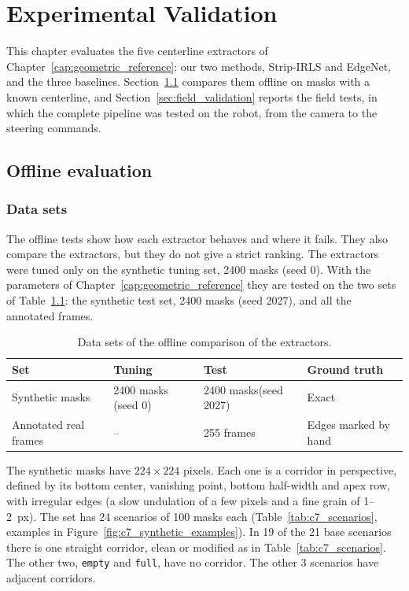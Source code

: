 \chapter{Experimental Validation}
\label{cap:experiments}

This chapter evaluates the five centerline extractors of Chapter~\ref{cap:geometric_reference}: our two methods, Strip-IRLS and EdgeNet, and the three baselines. Section~\ref{sec:offline_evaluation} compares them offline on masks with a known centerline, and Section~\ref{sec:field_validation} reports the field tests, in which the complete pipeline was tested on the robot, from the camera to the steering commands.

\section{Offline evaluation}
\label{sec:offline_evaluation}

\subsection{Data sets}
\label{subsec:geometric_accuracy}

The offline tests show how each extractor behaves and where it fails. They also compare the extractors, but they do not give a strict ranking. The extractors were tuned only on the synthetic tuning set, 2400 masks (seed 0). With the parameters of Chapter~\ref{cap:geometric_reference} they are tested on the two sets of Table~\ref{tab:c7_datasets}: the synthetic test set, 2400 masks (seed 2027), and all the annotated frames.

\begin{table}[htbp]
    \centering
    \footnotesize
    \caption{Data sets of the offline comparison of the extractors.}
    \label{tab:c7_datasets}
    \begin{tabularx}{\textwidth}{@{}l X X l@{}}
        \toprule
        Set & Tuning & Test & Ground truth \\
        \midrule
        Synthetic masks & 2400 masks (seed 0) & 2400 masks\newline (seed 2027) & Exact \\
        Annotated real frames & -- & 255 frames & Edges marked by hand \\
        \bottomrule
    \end{tabularx}
\end{table}

The synthetic masks have $224\times224$ pixels. Each one is a corridor in perspective, defined by its bottom center, vanishing point, bottom half-width and apex row, with irregular edges (a slow undulation of a few pixels and a fine grain of 1--2~px). The set has 24 scenarios of 100 masks each (Table~\ref{tab:c7_scenarios}, examples in Figure~\ref{fig:c7_synthetic_examples}). In 19 of the 21 base scenarios there is one straight corridor, clean or modified as in Table~\ref{tab:c7_scenarios}. The other two, \texttt{empty} and \texttt{full}, have no corridor. The other 3 scenarios have adjacent corridors.

